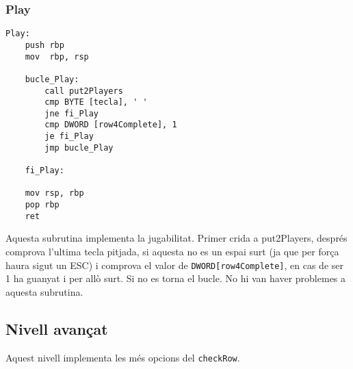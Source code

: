 \documentclass[a4paper,12pt]{article}
\begin{document}
\subsubsection{Play}
\begin{lstlisting}[firstnumber=880]
Play:
	push rbp
	mov  rbp, rsp

	bucle_Play:
		call put2Players
		cmp BYTE [tecla], ' '
		jne fi_Play
		cmp DWORD [row4Complete], 1
		je fi_Play
		jmp bucle_Play
		
	fi_Play:

	mov rsp, rbp
	pop rbp
	ret
\end{lstlisting}
Aquesta subrutina implementa la jugabilitat. Primer crida a put2Players, després comprova l'ultima tecla pitjada, si aquesta no es un espai surt (ja que per força haura sigut un ESC) i comprova el valor de \lstinline|DWORD[row4Complete]|, en cas de ser 1 ha guanyat i per allò surt. Si no es torna el bucle. No hi van haver problemes a aquesta subrutina.
\clearpage
\subsection{Nivell avançat}
Aquest nivell implementa les més opcions del \lstinline|checkRow|.
\end{document}
